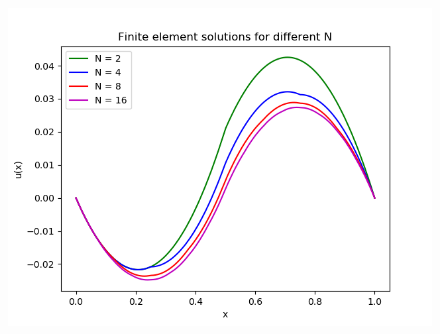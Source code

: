 \documentclass[11pt]{article}
\begin{document}
\begin{enumerate}
\begin{enumerate}
\begin{figure}[H]
\centering
\includegraphics[width=5in]{soln.png}
\end{figure}



  \end{enumerate}

\end{enumerate}
\end{document}
